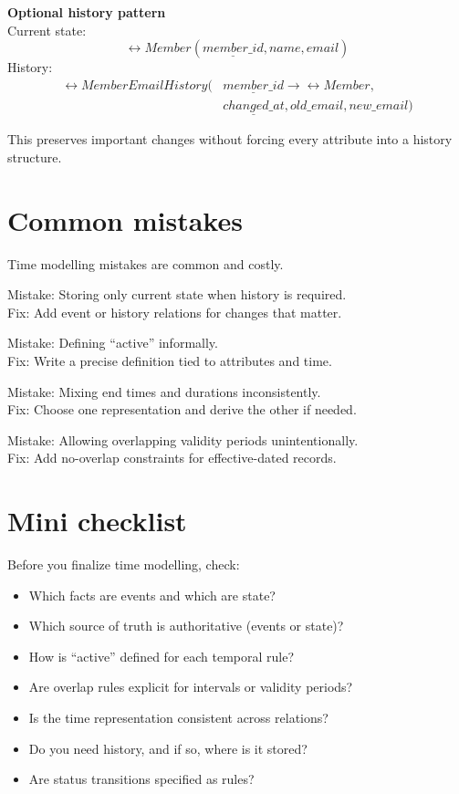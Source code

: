 \begin{examplebox}
\textbf{Optional history pattern}\\
Current state:
\[
\rel{Member}(\underline{member\_id}, name, email)
\]
History:
\[
\begin{aligned}
\rel{MemberEmailHistory}(&\underline{member\_id} \rightarrow \rel{Member}, \\
&\underline{changed\_at}, old\_email, new\_email)
\end{aligned}
\]
\end{examplebox}

This preserves important changes without forcing every attribute into a history structure.

\section{Common mistakes}
Time modelling mistakes are common and costly.

Mistake: Storing only current state when history is required.\\
Fix: Add event or history relations for changes that matter.

Mistake: Defining “active” informally.\\
Fix: Write a precise definition tied to attributes and time.

Mistake: Mixing end times and durations inconsistently.\\
Fix: Choose one representation and derive the other if needed.

Mistake: Allowing overlapping validity periods unintentionally.\\
Fix: Add no-overlap constraints for effective-dated records.

\section{Mini checklist}
Before you finalize time modelling, check:
\begin{itemize}[leftmargin=*,nosep]
  \item Which facts are events and which are state?
  \item Which source of truth is authoritative (events or state)?
  \item How is “active” defined for each temporal rule?
  \item Are overlap rules explicit for intervals or validity periods?
  \item Is the time representation consistent across relations?
  \item Do you need history, and if so, where is it stored?
  \item Are status transitions specified as rules?
\end{itemize}

